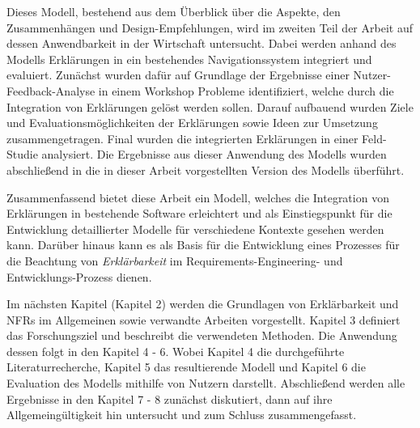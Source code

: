 Dieses Modell, bestehend aus dem Überblick über die Aspekte, den Zusammenhängen und Design-Empfehlungen, wird im zweiten Teil der Arbeit auf dessen Anwendbarkeit in der Wirtschaft untersucht. Dabei werden anhand des Modells Erklärungen in ein bestehendes Navigationssystem integriert und evaluiert. Zunächst wurden dafür auf Grundlage der Ergebnisse einer Nutzer-Feedback-Analyse in einem Workshop Probleme identifiziert, welche durch die Integration von Erklärungen gelöst werden sollen. Darauf aufbauend wurden Ziele und Evaluationsmöglichkeiten der Erklärungen sowie Ideen zur Umsetzung zusammengetragen. Final wurden die integrierten Erklärungen in einer Feld-Studie analysiert. Die Ergebnisse aus dieser Anwendung des Modells wurden abschließend in die in dieser Arbeit vorgestellten Version des Modells überführt.

Zusammenfassend bietet diese Arbeit ein Modell, welches die Integration von Erklärungen in bestehende Software erleichtert und als Einstiegspunkt für die Entwicklung detaillierter Modelle für verschiedene Kontexte gesehen werden kann. Darüber hinaus kann es als Basis für die Entwicklung eines Prozesses für die Beachtung von \textit{Erklärbarkeit} im Requirements-Engineering- und Entwicklungs-Prozess dienen.

Im nächsten Kapitel (Kapitel 2) werden die Grundlagen von Erklärbarkeit und NFRs im Allgemeinen sowie verwandte Arbeiten vorgestellt. Kapitel 3 definiert das Forschungsziel und beschreibt die verwendeten Methoden. Die Anwendung dessen folgt in den Kapitel 4 - 6. Wobei Kapitel 4 die durchgeführte Literaturrecherche, Kapitel 5 das resultierende Modell und Kapitel 6 die Evaluation des Modells mithilfe von Nutzern darstellt. Abschließend werden alle Ergebnisse in den Kapitel 7 - 8 zunächst diskutiert, dann auf ihre Allgemeingültigkeit hin untersucht und zum Schluss zusammengefasst.